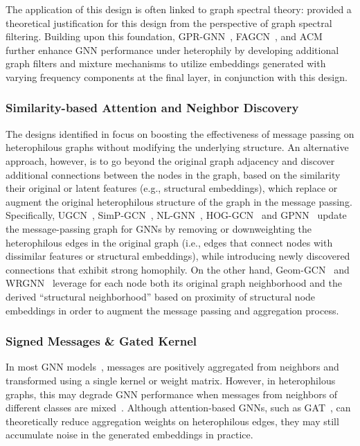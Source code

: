 The application of this design is often linked to graph spectral theory: \citet{zhu2020beyond}  provided a theoretical justification for this design from the perspective of graph spectral filtering. Building upon this foundation, GPR-GNN~\cite{chien2021adaptive}, FAGCN~\cite{bo2021beyond}, and ACM~\cite{luan2022revisiting} further enhance GNN performance under heterophily by developing additional graph filters and mixture mechanisms to utilize embeddings generated with varying frequency components at the final layer, in conjunction with this design.

\subsubsection{Similarity-based Attention and Neighbor Discovery}
The designs identified in \cite{zhu2020beyond} focus on boosting the effectiveness of message passing on heterophilous graphs without modifying the underlying structure. An alternative approach, however, is to go beyond the original graph adjacency and discover additional connections between the nodes in the graph, based on the similarity their original or latent features (e.g., structural embeddings), which replace or augment the original heterophilous structure of the graph in the message passing. 
Specifically, UGCN~\cite{jin2021universal}, SimP-GCN~\cite{jin2021node}, NL-GNN~\cite{liu2021non}, HOG-GCN~\cite{wang2022powerful} and GPNN~\cite{yang2022graph} update the message-passing graph for GNNs by removing or downweighting the heterophilous edges in the original graph (i.e., edges that connect nodes with dissimilar features or structural embeddings), while introducing newly discovered connections that exhibit strong homophily. 
On the other hand, Geom-GCN~\cite{Pei2020Geom-GCN} and WRGNN~\cite{suresh2021breaking} leverage for each node both its original graph neighborhood and the derived ``structural neighborhood'' based on proximity of structural node embeddings in order to augment the message passing and aggregation process. 

\subsubsection{Signed Messages \& Gated Kernel}
In most GNN models~\cite{kipf2016semi,velickovic2018graph}, messages are positively aggregated from neighbors and transformed using a single kernel or weight matrix. However, in heterophilous graphs, this may degrade GNN performance when messages from neighbors of different classes are mixed~\cite{zhu2020beyond,yan2022two}. Although attention-based GNNs, such as GAT~\cite{velickovic2018graph}, can theoretically reduce aggregation weights on heterophilous edges, they may still accumulate noise in the generated embeddings in practice.

